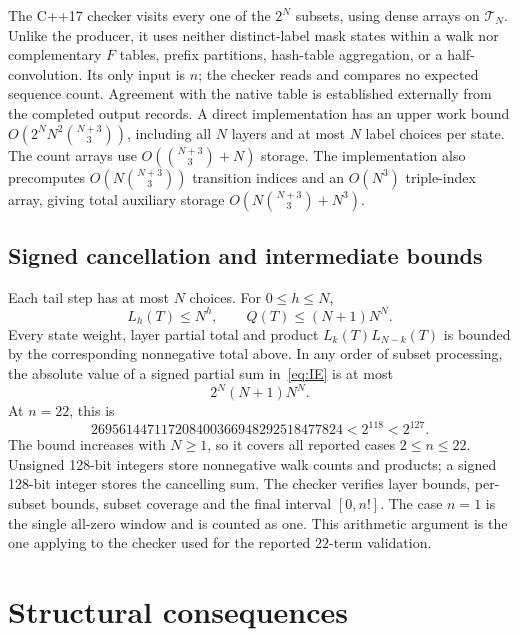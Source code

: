 \documentclass[11pt]{article}
\theoremstyle{definition}
\theoremstyle{remark}
\begin{document}
The C++17 checker visits every one of the $2^N$ subsets, using dense arrays
on $\mathcal T_N$. Unlike the producer, it uses neither distinct-label
mask states within a walk nor complementary $F$ tables, prefix partitions,
hash-table aggregation, or a half-convolution. Its only input is $n$;
the checker reads and compares no expected sequence count. Agreement with
the native table is established externally from the completed output records.
A direct
implementation has an upper work bound
$O(2^N N^2\binom{N+3}{3})$, including all $N$ layers and at most $N$ label
choices per state. The count arrays use $O(\binom{N+3}{3}+N)$ storage.
The implementation also precomputes $O(N\binom{N+3}{3})$ transition indices
and an $O(N^3)$ triple-index array, giving total auxiliary storage
$O(N\binom{N+3}{3}+N^3)$.

\subsection{Signed cancellation and intermediate bounds}
\label{sec:IE-arithmetic}

Each tail step has at most $N$ choices. For $0\leq h\leq N$,
\begin{equation}
 L_h(T)\leq N^h,\qquad Q(T)\leq(N+1)N^N.
 \label{eq:walkbound}
\end{equation}
Every state weight, layer partial total and product $L_k(T)L_{N-k}(T)$ is
bounded by the corresponding nonnegative total above. In any order of
subset processing, the absolute value of a signed partial sum
in~\eqref{eq:IE} is at most
\begin{equation}
 2^N(N+1)N^N.
 \label{eq:absolute}
\end{equation}
At $n=22$, this is
\[
 269561447117208400366948292518477824<2^{118}<2^{127}.
\]
The bound increases with $N\geq1$, so it covers all reported cases
$2\leq n\leq22$. Unsigned 128-bit integers store nonnegative walk counts
and products; a signed 128-bit integer stores the cancelling sum. The
checker verifies layer bounds, per-subset bounds, subset coverage and the
final interval $[0,n!]$. The case $n=1$ is the single all-zero window and
is counted as one. This arithmetic argument is the one applying to the
checker used for the reported $22$-term validation.

\section{Structural consequences}
\label{sec:structure}
\end{document}
